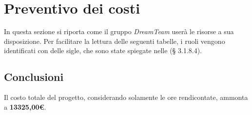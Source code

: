 \section{Preventivo dei costi}
In questa sezione si riporta come il gruppo \textit{DreamTeam} userà le risorse a sua disposizione. Per facilitare la lettura delle seguenti tabelle, i ruoli vengono identificati con delle sigle, che sono state spiegate nelle \textit{\NdP} (§ 3.1.8.4).


\pagebreak

\pagebreak

\pagebreak

\pagebreak


\subsection{Conclusioni}
Il costo totale del progetto, considerando solamente le ore rendicontate, ammonta a \textbf{13325,00\euro}.

\pagebreak